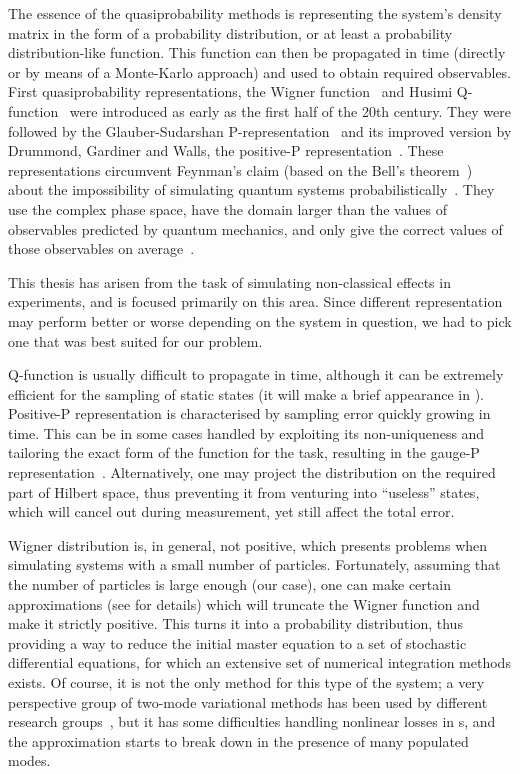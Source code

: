 The essence of the quasiprobability methods is representing the system's density matrix in the form of a probability distribution, or at least a probability distribution-like function.
This function can then be propagated in time (directly or by means of a Monte-Karlo approach) and used to obtain required observables.
First quasiprobability representations, the Wigner function~\cite{Wigner1932,Dirac1945,Moyal1947} and Husimi Q-function~\cite{Husimi1940} were introduced as early as the first half of the 20th century.
They were followed by the Glauber-Sudarshan P-representation~\cite{Sudarshan1963,Glauber1963b,Glauber1963} and its improved version by Drummond, Gardiner and Walls, the positive-P representation~\cite{Drummond1980,Drummond1981}.
These representations circumvent Feynman's claim (based on the Bell's theorem~\cite{Bell1964}) about the impossibility of simulating quantum systems probabilistically~\cite{Feynman1982}.
They use the complex phase space, have the domain larger than the values of observables predicted by quantum mechanics, and only give the correct values of those observables on average~\cite{Opanchuk2013-bell-sim}.

This thesis has arisen from the task of simulating non-classical effects in  experiments, and is focused primarily on this area.
Since different representation may perform better or worse depending on the system in question, we had to pick one that was best suited for our problem.

Q-function is usually difficult to propagate in time, although it can be extremely efficient for the sampling of static states (it will make a brief appearance in ).
Positive-P representation is characterised by sampling error quickly growing in time.
This can be in some cases handled by exploiting its non-uniqueness and tailoring the exact form of the function for the task, resulting in the gauge-P representation~\cite{Deuar2002}.
Alternatively, one may project the distribution on the required part of Hilbert space, thus preventing it from venturing into ``useless'' states, which will cancel out during measurement, yet still affect the total error.

Wigner distribution is, in general, not positive, which presents problems when simulating systems with a small number of particles.
Fortunately, assuming that the number of particles is large enough (our case), one can make certain approximations (see  for details) which will truncate the Wigner function and make it strictly positive.
This turns it into a probability distribution, thus providing a way to reduce the initial master equation to a set of stochastic differential equations, for which an extensive set of numerical integration methods exists.
Of course, it is not the only method for this type of the system; a very perspective group of two-mode variational methods has been used by different research groups~\cite{Li2008,Li2009,Sinatra2011},
but it has some difficulties handling nonlinear losses in s, and the approximation starts to break down in the presence of many populated modes.

